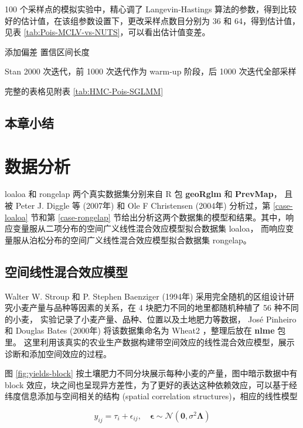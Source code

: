 \documentclass[12pt,a4paper,UTF8,twoside]{book}
\theoremstyle{definition}
\theoremstyle{definition}
\theoremstyle{definition}
\theoremstyle{remark}
\begin{document}
100 个采样点的模拟实验中，精心调了 Langevin-Hastings
算法的参数，得到比较好的估计值，在该组参数设置下，更改采样点数目分别为
36 和 64，得到估计值，见表
\ref{tab:Pois-MCLV-vs-NUTS}，可以看出估计值变差。

添加偏差 置信区间长度

Stan 2000 次迭代，前 1000 次迭代作为 warm-up 阶段，后 1000
次迭代全部采样

完整的表格见附表 \ref{tab:HMC-Pois-SGLMM}

\hypertarget{sec:simulations}{%
\section{本章小结}\label{sec:simulations}}

\hypertarget{applications}{%
\chapter{数据分析}\label{applications}}

loaloa 和 rongelap 两个真实数据集分别来自 R 包 \textbf{geoRglm} 和
\textbf{PrevMap}， 且被 Peter J. Diggle 等 (2007年)
\citep{Diggle2007ATMP} 和 Ole F Christensen (2004年)
\citep{Christensen2004} 分析过，第 \ref{case-loaloa} 节和第
\ref{case-rongelap}
节给出分析这两个数据集的模型和结果。其中，响应变量服从二项分布的空间广义线性混合效应模型拟合数据集
loaloa， 而响应变量服从泊松分布的空间广义线性混合效应模型拟合数据集
rongelap。

\hypertarget{sptial-random-effects}{%
\section{空间线性混合效应模型}\label{sptial-random-effects}}

Walter W. Stroup 和 P. Stephen Baenziger (1994年) \citep{Stroup1994}
采用完全随机的区组设计研究小麦产量与品种等因素的关系，在 4
块肥力不同的地里都随机种植了 56 种不同的小麦，
实验记录了小麦产量、品种、位置以及土地肥力等数据， José Pinheiro 和
Douglas Bates (2000年) \citep{Pinheiro2000} 将该数据集命名为 Wheat2
，整理后放在 \textbf{nlme} 包里。
这里利用该真实的农业生产数据构建带空间效应的线性混合效应模型，展示诊断和添加空间效应的过程。

图 \ref{fig:yields-block}
按土壤肥力不同分块展示每种小麦的产量，图中暗示数据中有 block
效应，块之间也呈现异方差性，为了更好的表达这种依赖效应，可以基于经纬度信息添加与空间相关的结构
(spatial correlation structures)，相应的线性模型

\begin{equation}
y_{ij} = \tau_i + \epsilon_{ij}, \quad \boldsymbol{\epsilon} \sim \mathcal{N}(\mathbf{0},\sigma^2 \boldsymbol{\Lambda}) \label{eq:extended-linear-model}
\end{equation}
\end{document}
